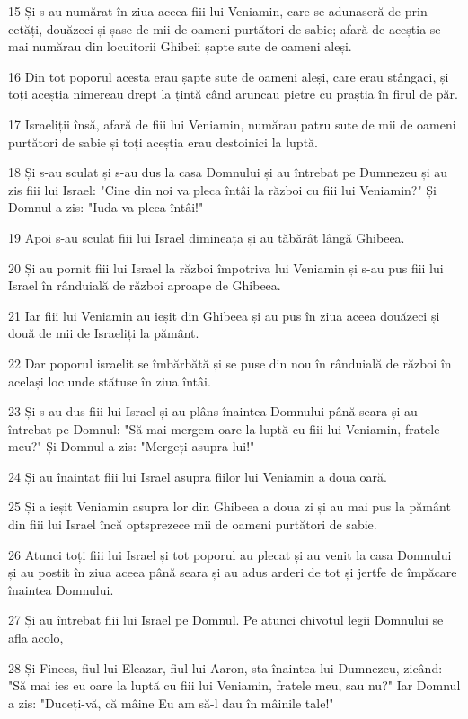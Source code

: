 \par 15 Și s-au numărat în ziua aceea fiii lui Veniamin, care se adunaseră de prin cetăți, douăzeci și șase de mii de oameni purtători de sabie; afară de aceștia se mai numărau din locuitorii Ghibeii șapte sute de oameni aleși.
\par 16 Din tot poporul acesta erau șapte sute de oameni aleși, care erau stângaci, și toți aceștia nimereau drept la țintă când aruncau pietre cu praștia în firul de păr.
\par 17 Israeliții însă, afară de fiii lui Veniamin, numărau patru sute de mii de oameni purtători de sabie și toți aceștia erau destoinici la luptă.
\par 18 Și s-au sculat și s-au dus la casa Domnului și au întrebat pe Dumnezeu și au zis fiii lui Israel: "Cine din noi va pleca întâi la război cu fiii lui Veniamin?" Și Domnul a zis: "Iuda va pleca întâi!"
\par 19 Apoi s-au sculat fiii lui Israel dimineața și au tăbărât lângă Ghibeea.
\par 20 Și au pornit fiii lui Israel la război împotriva lui Veniamin și s-au pus fiii lui Israel în rânduială de război aproape de Ghibeea.
\par 21 Iar fiii lui Veniamin au ieșit din Ghibeea și au pus în ziua aceea douăzeci și două de mii de Israeliți la pământ.
\par 22 Dar poporul israelit se îmbărbătă și se puse din nou în rânduială de război în același loc unde stătuse în ziua întâi.
\par 23 Și s-au dus fiii lui Israel și au plâns înaintea Domnului până seara și au întrebat pe Domnul: "Să mai mergem oare la luptă cu fiii lui Veniamin, fratele meu?" Și Domnul a zis: "Mergeți asupra lui!"
\par 24 Și au înaintat fiii lui Israel asupra fiilor lui Veniamin a doua oară.
\par 25 Și a ieșit Veniamin asupra lor din Ghibeea a doua zi și au mai pus la pământ din fiii lui Israel încă optsprezece mii de oameni purtători de sabie.
\par 26 Atunci toți fiii lui Israel și tot poporul au plecat și au venit la casa Domnului și au postit în ziua aceea până seara și au adus arderi de tot și jertfe de împăcare înaintea Domnului.
\par 27 Și au întrebat fiii lui Israel pe Domnul. Pe atunci chivotul legii Domnului se afla acolo,
\par 28 Și Finees, fiul lui Eleazar, fiul lui Aaron, sta înaintea lui Dumnezeu, zicând: "Să mai ies eu oare la luptă cu fiii lui Veniamin, fratele meu, sau nu?" Iar Domnul a zis: "Duceți-vă, că mâine Eu am să-l dau în mâinile tale!"
